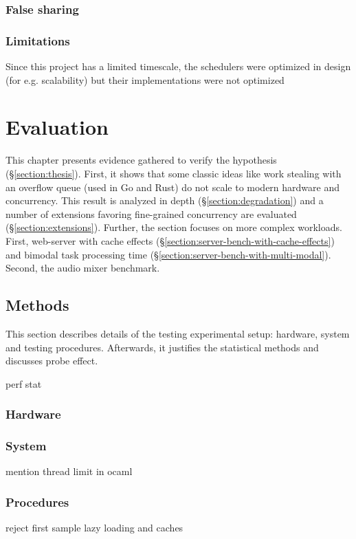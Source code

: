 \documentclass[12pt,a4paper,twoside]{report}
\begin{document}
\subsection{False sharing}

\subsection{Limitations}

Since this project has a limited timescale, the schedulers were optimized in design (for e.g. scalability) but their implementations were not optimized 




\chapter{Evaluation}
\label{chapter:evaluation}

This chapter presents evidence gathered to verify the hypothesis (\S\ref{section:thesis}). First, it shows that some classic ideas like work stealing with an overflow queue (used in Go and Rust) do not scale to modern hardware and concurrency. This result is analyzed in depth (\S\ref{section:degradation}) and a number of extensions favoring fine-grained concurrency are evaluated (\S\ref{section:extensions}). Further, the section focuses on more complex workloads. First, web-server with cache effects (\S\ref{section:server-bench-with-cache-effects}) 
and bimodal task processing time (\S\ref{section:server-bench-with-multi-modal}). Second, the audio mixer benchmark. 


\section{Methods}

This section describes details of the testing experimental setup: hardware, system and testing procedures. Afterwards, it justifies the statistical methods and discusses probe effect.

perf stat

\subsection{Hardware}

\subsection{System}
mention thread limit in ocaml
\subsection{Procedures}
reject first sample lazy loading and caches
\end{document}
